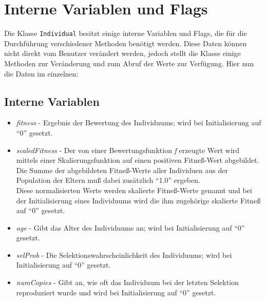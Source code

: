 \documentclass{report}
\begin{document}
\section{Interne Variablen und Flags}
Die Klasse {\tt Individual} besitzt einige interne Variablen und Flags,
die f\"ur die Durchf\"uhrung verschiedener Methoden ben\"otigt werden.
Diese Daten k\"onnen nicht direkt vom Benutzer ver\"andert werden, jedoch
stellt die Klasse einige Methoden zur Ver\"anderung und zum Abruf der Werte
zur Verf\"ugung. Hier nun die Daten im einzelnen:\\

\subsection{Interne Variablen}
\begin{itemize}
\item {\em fitness} -
Ergebnis der Bewertung des Individuums; wird bei Initialisierung auf 
``0'' gesetzt.

\item {\em scaledFitness} -
Der von einer Bewertungsfunktion {\em f} erzeugte Wert wird mittels
einer Skalierungsfunktion auf einen positiven Fitne{\ss}-Wert abgebildet.
Die Summe der abgebildeten Fitne{\ss}-Werte aller Individuen aus der 
Population der Eltern mu{\ss} dabei zus\"atzlich ``1.0'' ergeben.\\
Diese normalisierten Werte werden skalierte Fitne{\ss}-Werte genannt und
bei der Initialisierung eines Individuums wird die ihm zugeh\"orige
skalierte Fitne{\ss} auf ``0'' gesetzt.

\item {\em age} -
Gibt das Alter des Individuums an; wird bei Initialisierung auf ``0''
gesetzt.

\item {\em selProb} - Die Selektionswahrscheinlichkeit des Individuums; wird 
bei Initialisierung auf ``0'' gesetzt.

\item {\em numCopies} -
Gibt an, wie oft das Individuum bei der letzten Selektion
reproduziert wurde und wird bei Initialisierung auf ``0'' gesetzt.

\end{itemize}

\newpage
\end{document}
